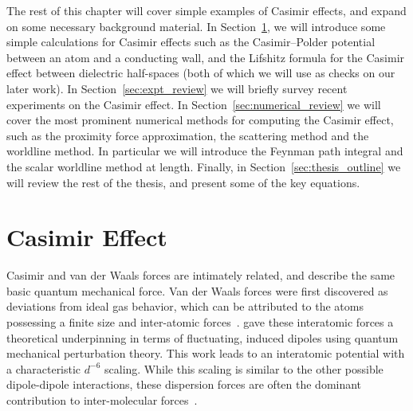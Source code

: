 The rest of this chapter will cover simple examples of Casimir effects, and expand on some necessary background material.
In Section~\ref{sec:casimir}, we will introduce some simple calculations for Casimir effects such as
the Casimir--Polder potential between an atom and a conducting wall, and the Lifshitz formula for the Casimir
effect between dielectric half-spaces (both of which we will use as checks on our later work).
In Section~\ref{sec:expt_review} we will briefly survey recent experiments on the Casimir effect.
In Section~\ref{sec:numerical_review} we will cover the most prominent numerical methods for computing the Casimir effect, such 
as the proximity force approximation, the scattering method and the worldline method.  
In particular we will introduce the Feynman path integral and the scalar worldline method at length.  
Finally, in Section~\ref{sec:thesis_outline} we will review the rest of the thesis, and present
some of the key equations.



\section{Casimir Effect}
\label{sec:casimir}
Casimir and van der Waals forces are intimately related, and describe the same basic quantum mechanical force. 
Van der Waals forces were first discovered as deviations from ideal gas behavior, which can be attributed 
to the atoms possessing a finite size and inter-atomic forces~\citep{vanderWaals,Parsegian2006}.
\citet{London1930} gave these interatomic forces a theoretical underpinning in terms of fluctuating,
 induced dipoles using quantum mechanical perturbation theory.
  This work leads to an interatomic potential with a characteristic $d^{-6}$ scaling.
While this scaling is similar to the other possible dipole-dipole interactions, 
these dispersion forces are often the dominant contribution to inter-molecular forces~\citep{Israelachvili2011}.

